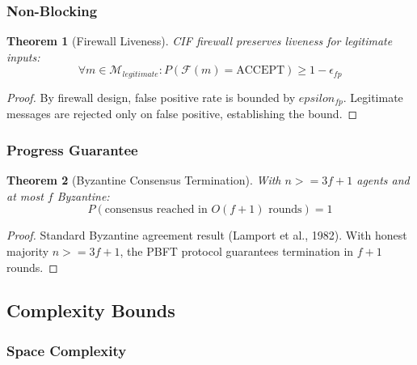 \documentclass[
]{article}
\newtheorem{theorem}{Theorem}[section]
\begin{document}
\subsubsection{Non-Blocking}\label{sec:non-blocking}

\begin{theorem}[Firewall Liveness]
\label{thm:firewall-liveness}
CIF firewall preserves liveness for legitimate inputs:
\begin{equation}
\label{eq:firewall-liveness}
\forall m \in \mathcal{M}_{legitimate}: P(\mathcal{F}(m) = \text{ACCEPT}) \geq 1 - \epsilon_{fp}
\end{equation}
\end{theorem}

\begin{proof}
By firewall design, false positive rate is bounded by $epsilon_{fp}$. Legitimate messages are rejected only on false positive, establishing the bound.
\end{proof}

\subsubsection{Progress Guarantee}\label{sec:progress-guarantee}

\begin{theorem}[Byzantine Consensus Termination]
\label{thm:byzantine-termination}
With $n >= 3f + 1$ agents and at most $f$ Byzantine:
\begin{equation}
\label{eq:consensus-termination}
P(\text{consensus reached in } O(f+1) \text{ rounds}) = 1
\end{equation}
\end{theorem}

\begin{proof}
Standard Byzantine agreement result (Lamport et al., 1982). With honest majority $n >= 3f + 1$, the PBFT protocol guarantees termination in $f+1$ rounds.
\end{proof}

\subsection{Complexity Bounds}\label{sec:complexity-bounds}

\subsubsection{Space Complexity}\label{sec:space-complexity}
\end{document}
